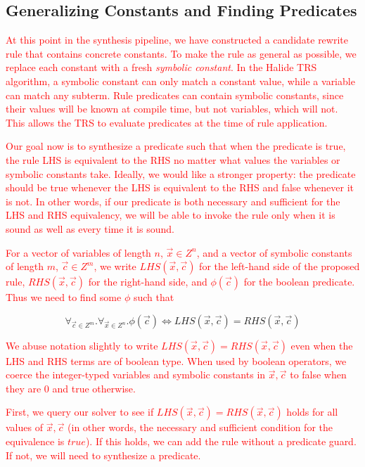 \documentclass[acmsmall,review]{acmart}\settopmatter{printfolios=true,printccs=false,printacmref=false}
\newcommand{\modified}[1]{\textcolor{red}{{#1}}}
\begin{document}
\subsection{Generalizing Constants and Finding Predicates}
\label{sec:generalizing-constants}

\modified{At this point in the synthesis pipeline, we have constructed a candidate rewrite
rule that contains concrete constants. To make the rule as general as possible, 
we replace each constant with a fresh \emph{symbolic constant}. In the Halide TRS 
algorithm, a symbolic constant can only match a constant value, while a variable 
can match any subterm. Rule predicates can contain symbolic constants, since their
values will be known at compile time, but not variables, which will not. This allows 
the TRS to evaluate predicates at the time of rule application. }

\modified{Our goal now is to synthesize a predicate such that when the predicate is true, 
the rule LHS is equivalent to the RHS no matter what values the variables or symbolic
constants take. Ideally, we would like a stronger property: the predicate should be 
true whenever the LHS is equivalent to the RHS and false whenever it is not. In other 
words, if our predicate is both necessary and sufficient for the LHS and RHS equivalency, 
we will be able to invoke the rule only when it is sound as well as every time it is sound.}

\modified{For a vector of variables of length $n$, $\vec{x} \in Z^n$, and a vector of symbolic 
constants of length $m$, $\vec{c} \in Z^m$, we write $LHS(\vec{x}, \vec{c})$ for the left-hand
side of the proposed rule, $RHS(\vec{x},\vec{c})$ for the right-hand side, and $\phi(\vec{c})$ 
for the boolean predicate. Thus we need to find some $\phi$ such that}

\[ \forall_{\vec{c} \in Z^m} . \forall_{\vec{x} \in Z^n} . \phi(\vec{c}) \iff LHS(\vec{x}, \vec{c}) = RHS(\vec{x}, \vec{c})
\]

\modified{We abuse notation slightly to write $LHS(\vec{x}, \vec{c}) = RHS(\vec{x}, \vec{c})$ even 
when the LHS and RHS terms are of boolean type. When used by boolean operators, we coerce the integer-typed variables 
and symbolic constants in $\vec{x}, \vec{c}$ to false when they are 0 and true otherwise.}

\modified{First, we query our solver to see if $LHS(\vec{x}, \vec{c}) = RHS(\vec{x}, \vec{c})$ holds
for all values of $\vec{x}, \vec{c}$ (in other words, the necessary and sufficient 
condition for the equivalence is $true$). If this holds, we can add the rule without 
a predicate guard. If not, we will need to synthesize a predicate. }
\end{document}

